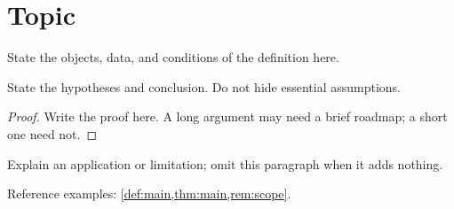 \documentclass[11pt,a4paper]{article}
\begin{document}
\section{Topic}
\begin{definition}[Concept]\label{def:main}
State the objects, data, and conditions of the definition here.
\end{definition}
\begin{theorem}[Result]\label{thm:main}
State the hypotheses and conclusion. Do not hide essential assumptions.
\end{theorem}
\begin{proof}
Write the proof here. A long argument may need a brief roadmap; a short one need not.
\end{proof}
\begin{remark}\label{rem:scope}
Explain an application or limitation; omit this paragraph when it adds nothing.
\end{remark}
Reference examples: \cref{def:main,thm:main,rem:scope}.
\end{document}

